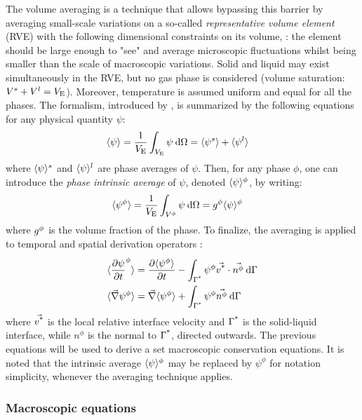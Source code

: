 The volume averaging is a technique that allows bypassing this barrier by averaging
small-scale variations on a so-called \emph{representative volume element} (RVE) \citep{dantzig_solidification_2009} with the 
following dimensional constraints on its volume, \rev:
the element should be large enough to "see" and average microscopic fluctuations whilst being smaller than the scale of macroscopic variations.
Solid and liquid may exist simultaneously in the RVE, but no gas phase is considered (volume saturation: $V^s+V^l=V_\text{E}$). 
Moreover, temperature is assumed uniform and equal for all the phases.
The formalism, introduced by \citet{ni_volume-averaged_1991}, is summarized by the following equations for any physical quantity $\psi$:
\begin{align}
\label{eq:volumeaveraging1}
& \langle \psi \rangle = \frac{1}{V_\text{E}} \int_{V_\text{E}} \psi\: \mathrm{d}\Omega = \langle \psi^s \rangle + \langle \psi^l \rangle
\end{align}
where $\langle \psi \rangle^s$ and $\langle \psi \rangle^l$ are phase averages of $\psi$. Then, for any phase $\phi$, one can introduce the \emph{phase intrinsic average} of $\psi$, denoted $\langle \psi \rangle^\phi$, by writing:
\begin{align}
\label{eq:volumeaveraging2}
& \langle \psi^\phi \rangle = \frac{1}{V_\text{E}} \int_{V^\phi} \psi\: \mathrm{d}\Omega = g^{\phi}  \langle \psi \rangle^\phi
\end{align}
where $g^{\phi} $ is the volume fraction of the phase. To finalize, the averaging is applied to temporal and spatial derivation operators \citep{rivaux_simulation_2011}:
\begin{align}
\label{eq:volumeaveraging3}
& \langle  \frac{\partial \psi}{\partial t} ^\phi  \rangle = \frac{\partial \langle \psi^\phi \rangle}{\partial t} - \int_{{\Gamma}^{\text{*}} } \psi^\phi \vec{v^\text{*}} \cdot \vec{n^\phi}\: \mathrm{d}\Gamma \\
& \langle  \vec{\nabla} \psi^\phi  \rangle = \vec{\nabla} \langle \psi^\phi \rangle + \int_{{\Gamma}^{\text{*}} } \psi^\phi \vec{n^\phi}\: \mathrm{d}\Gamma
\end{align}
where $\vec{v^\text{*}}$ is the local relative interface velocity and ${\Gamma}^{\text{*}} $ is the solid-liquid interface, while $n^\phi$ is the normal to ${\Gamma}^{\text{*}} $, directed outwards.
The previous equations will be used to derive a set macroscopic conservation equations. It is noted that the intrinsic average $\langle \psi \rangle^\phi$ may
be replaced by ${\psi}^\phi$ for notation simplicity, whenever the averaging technique applies.
\subsubsection{Macroscopic equations}


